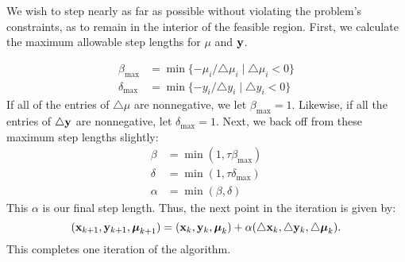We wish to step nearly as far as possible without violating the problem’s constraints, as to remain in the interior of the feasible region. 
First, we calculate the maximum allowable step lengths for $\mu$ and $\mathbf{y}$.

\begin{align*}
\beta_{\max} &= \min\{-\mu_i/\triangle \mu_i \mid \triangle \mu_i < 0 \}\\
\delta_{\max} &=\min\{-y_i/\triangle y_i \mid \triangle y_i < 0 \}
\end{align*}
If all of the entries of $\triangle \mu$ are nonnegative, we let $\beta_{\max} = 1$.
Likewise, if all the entries of $\triangle \mathbf{y}$ are nonnegative, let $\delta_{\max}=1$.
Next, we back off from these maximum step lengths slightly:
\begin{align*}
\beta &= \min(1, \tau\beta_{\max})\\
\delta &= \min(1, \tau\delta_{\max})\\
\alpha &= \min(\beta, \delta)
\end{align*}
This $\alpha$ is our final step length.
Thus, the next point in the iteration is given by:
\[
(\mathbf{x}_{k+1}, \mathbf{y}_{k+1}, \boldsymbol{\mu}_{k+1}) = (\mathbf{x}_k, \mathbf{y}_k, \boldsymbol{\mu}_k) + \alpha(\triangle \mathbf{x}_k, \triangle \mathbf{y}_k, \triangle \boldsymbol{\mu}_k).
\]
This completes one iteration of the algorithm.

\begin{comment} %
\begin{info}
As with our Interior Point method for linear constrained optimization, the most expensive part of each iteration is solving the linear systems \ref{eq:affine} and \ref{eq:perturbed}.
Note, however, that these systems both have the same matrix on the left-hand side.
This allows us to factor the matrix just once per iteration, and use the factorization to solve both systems.
A more sophisticated implementation would likely split up these large systems of equations into a few smaller ones, and then use Cholesky-based factorizations.
To simplify matters, we suggest simply using as a first attempt an LU decomposition on the entire matrix.
\end{info}
\end{comment}

